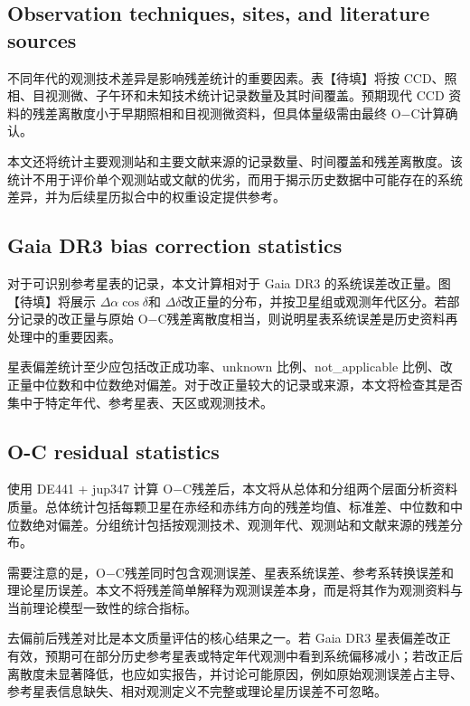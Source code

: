 \documentclass{aastex701}
\newcommand{\oc}{O$-$C}
\newcommand{\dra}{$\Delta\alpha\cos\delta$}
\newcommand{\ddec}{$\Delta\delta$}
\begin{document}
\subsection{Observation techniques, sites, and literature sources} \label{subsec:techniques}

不同年代的观测技术差异是影响残差统计的重要因素。表【待填】将按 CCD、照相、目视测微、子午环和未知技术统计记录数量及其时间覆盖。预期现代 CCD 资料的残差离散度小于早期照相和目视测微资料，但具体量级需由最终 \oc 计算确认。

本文还将统计主要观测站和主要文献来源的记录数量、时间覆盖和残差离散度。该统计不用于评价单个观测站或文献的优劣，而用于揭示历史数据中可能存在的系统差异，并为后续星历拟合中的权重设定提供参考。

\subsection{Gaia DR3 bias correction statistics} \label{subsec:bias_results}

对于可识别参考星表的记录，本文计算相对于 Gaia DR3 的系统误差改正量。图【待填】将展示 \dra 和 \ddec 改正量的分布，并按卫星组或观测年代区分。若部分记录的改正量与原始 \oc 残差离散度相当，则说明星表系统误差是历史资料再处理中的重要因素。

星表偏差统计至少应包括改正成功率、unknown 比例、not\_applicable 比例、改正量中位数和中位数绝对偏差。对于改正量较大的记录或来源，本文将检查其是否集中于特定年代、参考星表、天区或观测技术。

\subsection{O-C residual statistics} \label{subsec:residual_results}

使用 DE441 + jup347 计算 \oc 残差后，本文将从总体和分组两个层面分析资料质量。总体统计包括每颗卫星在赤经和赤纬方向的残差均值、标准差、中位数和中位数绝对偏差。分组统计包括按观测技术、观测年代、观测站和文献来源的残差分布。

需要注意的是，\oc 残差同时包含观测误差、星表系统误差、参考系转换误差和理论星历误差。本文不将残差简单解释为观测误差本身，而是将其作为观测资料与当前理论模型一致性的综合指标。

去偏前后残差对比是本文质量评估的核心结果之一。若 Gaia DR3 星表偏差改正有效，预期可在部分历史参考星表或特定年代观测中看到系统偏移减小；若改正后离散度未显著降低，也应如实报告，并讨论可能原因，例如原始观测误差占主导、参考星表信息缺失、相对观测定义不完整或理论星历误差不可忽略。
\end{document}
